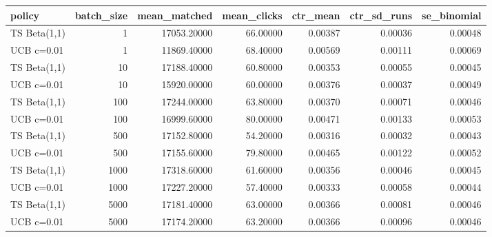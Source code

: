 \begin{tabular}{lrrrrrr}
\toprule
policy & batch\_size & mean\_matched & mean\_clicks & ctr\_mean & ctr\_sd\_runs & se\_binomial \\
\midrule
TS Beta(1,1) & 1 & 17053.20000 & 66.00000 & 0.00387 & 0.00036 & 0.00048 \\
UCB c=0.01 & 1 & 11869.40000 & 68.40000 & 0.00569 & 0.00111 & 0.00069 \\
TS Beta(1,1) & 10 & 17188.40000 & 60.80000 & 0.00353 & 0.00055 & 0.00045 \\
UCB c=0.01 & 10 & 15920.00000 & 60.00000 & 0.00376 & 0.00037 & 0.00049 \\
TS Beta(1,1) & 100 & 17244.00000 & 63.80000 & 0.00370 & 0.00071 & 0.00046 \\
UCB c=0.01 & 100 & 16999.60000 & 80.00000 & 0.00471 & 0.00133 & 0.00053 \\
TS Beta(1,1) & 500 & 17152.80000 & 54.20000 & 0.00316 & 0.00032 & 0.00043 \\
UCB c=0.01 & 500 & 17155.60000 & 79.80000 & 0.00465 & 0.00122 & 0.00052 \\
TS Beta(1,1) & 1000 & 17318.60000 & 61.60000 & 0.00356 & 0.00046 & 0.00045 \\
UCB c=0.01 & 1000 & 17227.20000 & 57.40000 & 0.00333 & 0.00058 & 0.00044 \\
TS Beta(1,1) & 5000 & 17181.40000 & 63.00000 & 0.00366 & 0.00081 & 0.00046 \\
UCB c=0.01 & 5000 & 17174.20000 & 63.20000 & 0.00366 & 0.00096 & 0.00046 \\
\bottomrule
\end{tabular}
